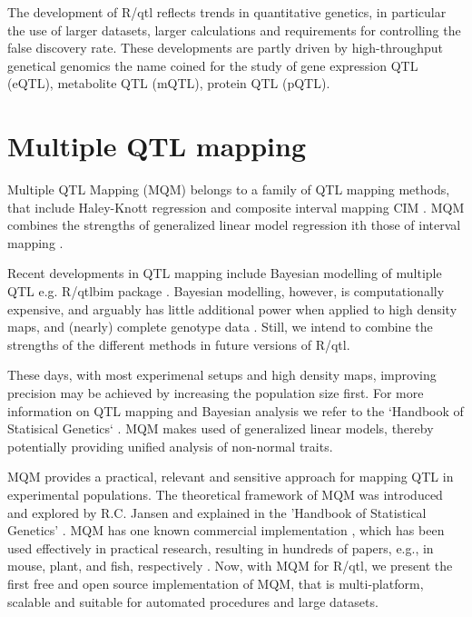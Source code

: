 The development of R/qtl reflects trends in quantitative genetics, in particular the use of 
larger datasets, larger calculations and requirements for controlling the false discovery rate. 
These developments are partly driven by high-throughput genetical genomics the name coined 
for the study of gene expression QTL (eQTL)\cite{Jansen:2001a}, metabolite QTL (mQTL), protein 
QTL (pQTL).

\section{Multiple QTL mapping}
Multiple QTL Mapping (MQM) belongs to a family of QTL mapping methods, that include Haley-Knott 
regression \cite{Haley:1992} and composite interval mapping CIM \cite{Zeng:1994}. MQM combines 
the strengths of generalized linear model regression ith those of interval mapping 
\cite{Jansen:1993, Jansen:1994b}. 

Recent developments in QTL mapping include Bayesian modelling of multiple QTL e.g. R/qtlbim 
package \cite{Yandell:2007, Banerjee:2008}. Bayesian modelling, however, is computationally 
expensive, and arguably has little additional power when applied to high density maps, and 
(nearly) complete genotype data \cite{Handbook:Jansen:2007}. Still, we intend to combine the 
strengths of the different methods in future versions of R/qtl.

These days, with most experimenal setups and high density maps, improving precision may be 
achieved by increasing the population size first. For more information on QTL mapping and 
Bayesian analysis we refer to the `Handbook of Statisical Genetics` \cite{Handbook:2007}. MQM 
makes used of generalized linear models, thereby potentially providing unified analysis of 
non-normal traits.

MQM provides a practical, relevant and sensitive approach for mapping QTL in experimental 
populations. The theoretical framework of MQM was introduced and explored by R.C. Jansen 
\cite{Jansen:1994a} and explained in the 'Handbook of Statistical Genetics' 
\cite{Handbook:Jansen:2007}. MQM has one known commercial implementation \cite{Mapqtl:2002}, 
which has been used effectively in practical research, resulting in hundreds of papers, e.g., 
in mouse, plant, and fish, respectively \cite{DeMooij:2009, Jeuken:2009, Kitano:2009}. Now, 
with MQM for R/qtl, we present the first free and open source implementation of MQM, that is 
multi-platform, scalable and suitable for automated procedures and large datasets.

